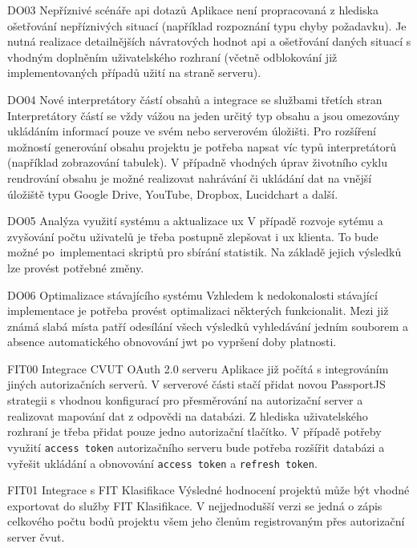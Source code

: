 \begin{dl}
   \item[DO03 Nepříznivé scénáře \gls{api} dotazů] 
   Aplikace není propracovaná z hlediska ošetřování nepříznivých situací (například rozpoznání typu chyby požadavku). Je nutná realizace detailnějších návratových hodnot \gls{api} a ošetřování daných situací s vhodným doplněním uživatelského rozhraní (včetně odblokování již implementovaných případů užití na straně serveru).

   \item[DO04 Nové interpretátory částí obsahů a integrace se službami třetích stran]
   Interpretátory částí se vždy vážou na jeden určitý typ obsahu a jsou omezovány ukládáním informací pouze ve svém nebo serverovém úložišti. Pro rozšíření možností generování obsahu projektu je potřeba napsat víc typů interpretátorů (například zobrazování tabulek). V případně vhodných úprav životního cyklu rendrování obsahu je možné realizovat nahrávání či ukládání dat na vnější úložiště typu Google Drive, YouTube, Dropbox, Lucidchart a další.

   \item[DO05 Analýza využití systému a aktualizace \gls{ux}]
   V případě rozvoje sytému a zvyšování počtu uživatelů je třeba postupně zlepšovat i \gls{ux} klienta. To bude možné po~implementaci skriptů pro sbírání statistik. Na základě jejich výsledků lze provést potřebné změny.
   
   \item[DO06 Optimalizace stávajícího systému]
   Vzhledem k nedokonalosti stávající implementace je potřeba provést optimalizaci některých funkcionalit. Mezi již známá slabá místa patří odesílání všech výsledků vyhledávání jedním souborem a absence automatického obnovování \gls{jwt} po vypršení doby platnosti.
   
   \item[FIT00 Integrace CVUT OAuth 2.0 serveru]
   Aplikace již počítá s integrováním jiných autorizačních serverů. V serverové části stačí přidat novou PassportJS strategii s vhodnou konfigurací pro přesměrování na autorizační server a realizovat mapování dat z odpovědi na databázi. Z hlediska uživatelského rozhraní je třeba přidat pouze jedno autorizační tlačítko. V případě potřeby využití \texttt{access token} autorizačního serveru bude potřeba rozšířit databázi a vyřešit ukládání a obnovování \texttt{access token} a \texttt{refresh token}.

   \item[FIT01 Integrace s FIT Klasifikace]
   Výsledné hodnocení projektů může být vhodné exportovat do služby FIT Klasifikace. V nejjednodušší verzi se jedná o zápis celkového počtu bodů projektu všem jeho členům registrovaným přes autorizační server \gls{čvut}. 

\end{dl}
